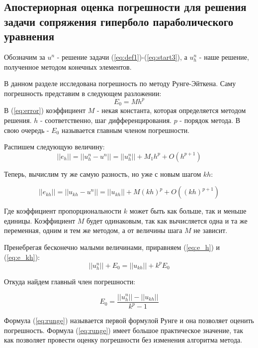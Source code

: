\subsection{Апостериорная оценка погрешности для решения задачи сопряжения гиперболо параболического уравнения}


Обозначим за $u^n$ - решение задачи (\ref{eq:def1})-(\ref{eq:start3}), а $u_h^n$ - наше решение, полученное методом конечных элементов.

В данном разделе исследована погрешность по методу Рунге-Эйткена\cite{bib:logg}.
Саму погрешность представим в следующем разложении:
\begin{equation}
    E_0 = Mh^p
    \label{eq:error}
\end{equation}
В (\ref{eq:error}) коэффициент $M$ - некая константа, которая определяется методом решения. $h$ - соответственно, шаг дифференцирования. $p$ - порядок метода.
В свою очередь - $E_0$ называется главным членом погрешности. 

Распишем следующую величину:
\begin{equation}
     ||e_h|| = ||u_h^n - u^n|| = ||u_h^n|| + M_1h^p + O(h^{p+1}) 
    \label{eq:e_h}
\end{equation}

Теперь, вычислим ту же самую разность, но уже с новым шагом $kh$:

\begin{equation}
     ||e_{kh}|| = ||u_{kh} - u^n|| = ||u_{kh}|| + M(kh)^p + O((kh)^{p+1}) 
    \label{eq:e_kh}
\end{equation}

Где коэффициент пропорциональности $k$ может быть как больше, так и меньше единицы. Коэффициент $M$ будет одинаковым, так как вычисляется одна и та же переменная, одним и тем же методом, а от величины шага $M$ не зависит.

Пренебрегая бесконечно малыми величинами, приравняем (\ref{eq:e_h}) и (\ref{eq:e_kh}):
$$
||u_h^n|| + E_0 = ||u_{kh}|| + k^pE_0
$$

Откуда найдем главный член погрешности:

\begin{equation}
    E_0 = \frac{||u_h^n|| - ||u_{kh}||}{k^p - 1}
    \label{eq:runge}
\end{equation}

Формула (\ref{eq:runge}) называется первой формулой Рунге и она позволяет оценить погрешность. Формула (\ref{eq:runge}) имеет большое практическое значение, так как позволяет провести оценку погрешности без изменения алгоритма метода.

